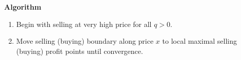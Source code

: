 \documentclass{beamer}
\begin{document}
\begin{frame}
\begin{columns}
{}
\end{columns}
\end{frame}

\begin{frame}
{\bf Algorithm}
\begin{enumerate}
  \item Begin with selling at very high price for all $q>0$.
  \item Move selling (buying) boundary along price $x$ to local maximal selling (buying) profit points until convergence. 
\end{enumerate}

\end{frame}
\end{document}

